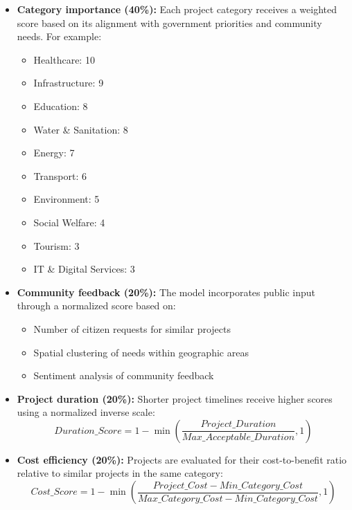 \documentclass[12pt,a4paper]{report}
\begin{document}
\begin{itemize}
    \item \textbf{Category importance (40\%):} Each project category receives a weighted score based on its alignment with government priorities and community needs. For example:
    \begin{itemize}
        \item Healthcare: 10
        \item Infrastructure: 9
        \item Education: 8
        \item Water \& Sanitation: 8
        \item Energy: 7
        \item Transport: 6
        \item Environment: 5
        \item Social Welfare: 4
        \item Tourism: 3
        \item IT \& Digital Services: 3
    \end{itemize}
    
    \item \textbf{Community feedback (20\%):} The model incorporates public input through a normalized score based on:
    \begin{itemize}
        \item Number of citizen requests for similar projects
        \item Spatial clustering of needs within geographic areas
        \item Sentiment analysis of community feedback
    \end{itemize}
    
    \item \textbf{Project duration (20\%):} Shorter project timelines receive higher scores using a normalized inverse scale:
    \begin{equation}
        Duration\_Score = 1 - \min\left(\frac{Project\_Duration}{Max\_Acceptable\_Duration}, 1\right)
    \end{equation}
    
    \item \textbf{Cost efficiency (20\%):} Projects are evaluated for their cost-to-benefit ratio relative to similar projects in the same category:
    \begin{equation}
        Cost\_Score = 1 - \min\left(\frac{Project\_Cost - Min\_Category\_Cost}{Max\_Category\_Cost - Min\_Category\_Cost}, 1\right)
    \end{equation}
\end{itemize}
\end{document}
